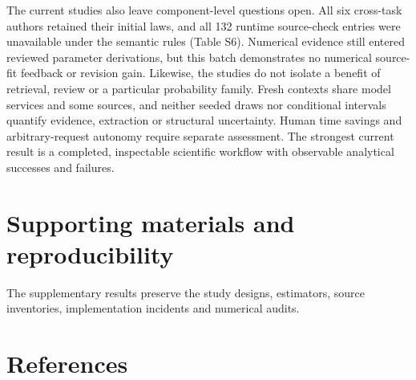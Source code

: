 \documentclass[sigconf,anonymous,review]{acmart}
\begin{document}
The current studies also leave component-level questions open. All six cross-task authors retained their initial laws, and all 132 runtime source-check entries were unavailable under the semantic rules (Table S6). Numerical evidence still entered reviewed parameter derivations, but this batch demonstrates no numerical source-fit feedback or revision gain. Likewise, the studies do not isolate a benefit of retrieval, review or a particular probability family. Fresh contexts share model services and some sources, and neither seeded draws nor conditional intervals quantify evidence, extraction or structural uncertainty. Human time savings and arbitrary-request autonomy require separate assessment. The strongest current result is a completed, inspectable scientific workflow with observable analytical successes and failures.


\section*{Supporting materials and reproducibility}

The supplementary results preserve the study designs, estimators, source inventories, implementation incidents and numerical audits.


\clearpage

\section*{References}

\begingroup
\end{document}
